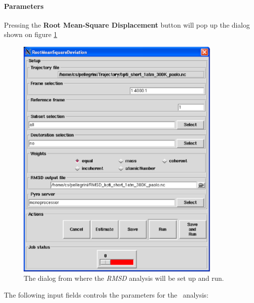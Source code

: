 \documentclass[a4paper,11pt]{report}
\begin{document}
\paragraph{Parameters\\}
\label{rmsd_parameters}
Pressing the \textbf{Root Mean-Square Displacement} button will pop up the dialog shown on figure \ref{fig:rmsd}
\begin{figure}[h!]
\begin{center}
\includegraphics[width=10cm]{Figures/rmsd.eps}
\end{center}
\caption[The \textit{RMSD} analysis dialog]{The dialog from where the \textit{RMSD} analysis will be set up and run.}
\label{fig:rmsd}
\end{figure}   

The following input fields controls the parameters for the \RMSD\ analysis:
\end{document}
